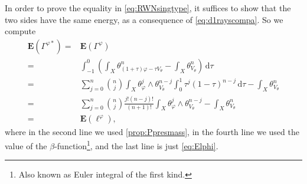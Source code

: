 \begin{example}
    In order to prove the equality in \eqref{eq:RWNsingtype}, it suffices to show that the two sides have the same energy, as a consequence of \eqref{eq:d1rayscompa}. So we compute
    \[
    \begin{aligned}
        \mathbf{E}\left(\Gamma^{\varphi*}\right)=& \mathbf{E}\left(\Gamma^{\varphi}\right)\\
        =& \int_{-1}^0 \left(\int_X \theta_{(1+\tau)\varphi-\tau V_{\theta}}^n-\int_X \theta_{V_{\theta}}^n\right)\,\mathrm{d}\tau\\
        =& \sum_{j=0}^{n} \binom{n}{j} \int_X \theta_{\varphi}^{j}\wedge \theta_{V_{\theta}}^{n-j} \int_0^1 \tau^j (1-\tau)^{n-j}\,\mathrm{d}\tau-\int_X \theta_{V_{\theta}}^n\\
        =& \sum_{j=0}^{n} \binom{n}{j}\frac{j!(n-j)!}{(n+1)!} \int_X \theta_{\varphi}^{j}\wedge \theta_{V_{\theta}}^{n-j}-\int_X \theta_{V_{\theta}}^n\\
        =& \mathbf{E}(\ell^{\varphi}),
    \end{aligned}
    \]
    where in the second line we used \cref{prop:Ppresmass}, in the fourth line we used the value of the $\beta$-function\footnote{Also known as Euler integral of the first kind.}, and the last line is just \eqref{eq:Elphi}.
\end{example}

